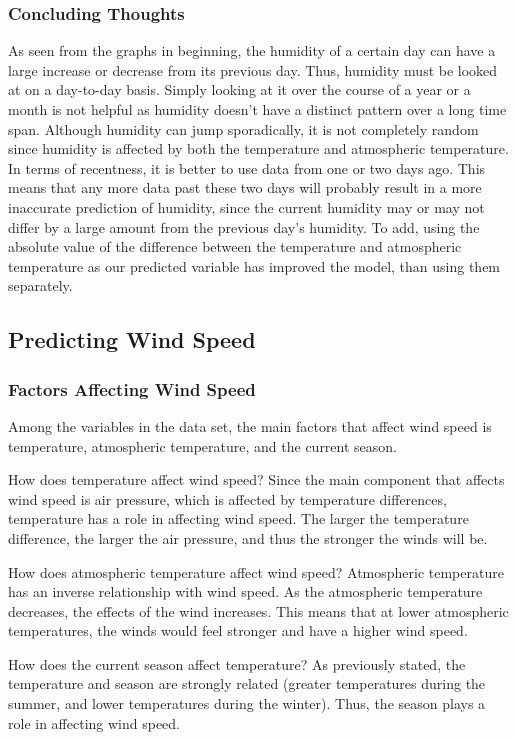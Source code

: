 \documentclass[12pt]{article}
\begin{document}
\subsubsection{Concluding Thoughts}
As seen from the graphs in beginning, the humidity of a certain day can have a large increase or decrease from its previous day. Thus, humidity must be looked at on a day-to-day basis. Simply looking at it over the course of a year or a month is not helpful as humidity doesn't have a distinct pattern over a long time span. Although humidity can jump sporadically, it is not completely random since humidity is affected by both the temperature and atmospheric temperature. In terms of recentness, it is better to use data from one or two days ago. This means that any more data past these two days will probably result in a more inaccurate prediction of humidity, since the current humidity may or may not differ by a large amount from the previous day's humidity. To add, using the absolute value of the difference between the temperature and atmospheric temperature as our predicted variable has improved the model, than using them separately. 
 
\newpage
\subsection{Predicting Wind Speed}
\subsubsection{Factors Affecting Wind Speed}

Among the variables in the data set, the main factors that affect wind speed is temperature, atmospheric temperature, and the current season.

How does temperature affect wind speed?
Since the main component that affects wind speed is air pressure, which is affected by temperature differences, temperature has a role in affecting wind speed. The larger the temperature difference, the larger the air pressure, and thus the stronger the winds will be.  

How does atmospheric temperature affect wind speed?
Atmospheric temperature has an inverse relationship with wind speed. As the atmospheric temperature decreases, the effects of the wind increases. This means that at lower atmospheric temperatures, the winds would feel stronger and have a higher wind speed.

How does the current season affect temperature?
As previously stated, the temperature and season are strongly related (greater temperatures during the summer, and lower temperatures during the winter). Thus, the 
season plays a role in affecting wind speed.
\end{document}
